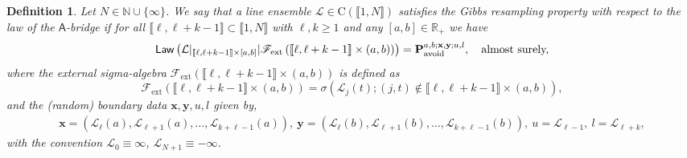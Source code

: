 \documentclass[]{article}
\newtheorem{defn}[thm]{Definition}
\begin{document}
\begin{defn}\label{GibbsDefinition}
Let $N \in \mathbb{N}\cup \{\infty\}$. We say that a line ensemble $\mathcal{L}\in \mathrm{C}(\llbracket 1, N \rrbracket)$ satisfies the Gibbs resampling property with respect to the law of the $\mathsf{A}$-bridge if for all $\llbracket \ell,\ell+k-1 \rrbracket \subset \llbracket 1, N \rrbracket$ with $\ell, k \ge 1$ and any $[a,b]\in \mathbb{R}_+$ we have
\begin{equation}\label{GibbsPropertyFormal}
\mathsf{Law}\left(\mathcal{L}|_{\llbracket \ell,\ell+k-1 \rrbracket \times [a,b]}|\mathscr{F}_{\mathrm{ext}}\left(\llbracket \ell, \ell+k-1 \rrbracket \times (a,b) \right)\right)=\mathbf{P}_{\mathrm{avoid}}^{a,b;\mathbf{x},\mathbf{y};u,l},\ \ \textnormal{ almost surely,}
\end{equation}
where the external sigma-algebra $\mathscr{F}_{\mathrm{ext}}\left(\llbracket \ell, \ell+k-1 \rrbracket \times (a,b) \right)$ is defined as
\begin{equation}\label{ExternalSigmaAlgebra}
\mathscr{F}_{\mathrm{ext}}\left(\llbracket \ell, \ell+k-1 \rrbracket \times (a,b) \right)= \sigma\left(\mathcal{L}_j(t);(j,t)\notin \llbracket \ell, \ell+k-1 \rrbracket\times (a,b)\right), 
\end{equation}
and the (random) boundary data $\mathbf{x},\mathbf{y},u,l$ given by,
\begin{align*}
\mathbf{x}=\left(\mathcal{L}_\ell(a),\mathcal{L}_{\ell+1}(a),\dots,\mathcal{L}_{k+\ell-1}(a)\right), \  \mathbf{y}=\left(\mathcal{L}_{\ell}(b),\mathcal{L}_{\ell+1}(b),\dots,\mathcal{L}_{k+\ell-1}(b)\right), \ u=\mathcal{L}_{\ell-1},  \ l=\mathcal{L}_{\ell+k},
\end{align*}
with the convention $\mathcal{L}_{0}\equiv \infty$, $\mathcal{L}_{N+1}\equiv -\infty$.
\end{defn}
\end{document}
